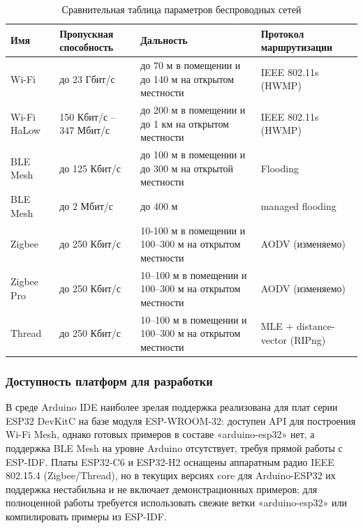 \documentclass[a4paper,12pt]{article}
\begin{document}
\begin{table}[h!]
    \centering
    \renewcommand{\arraystretch}{1.3}
    \begin{tabularx}{\textwidth}{|X|X|X|X|}
        \hline
        \textbf{Имя} & \textbf{Пропускная способность} & \textbf{Дальность} & \textbf{Протокол маршрутизации} \\
        \hline
        Wi-Fi & до 23 Гбит/с & до 70 м в помещении и до 140 м на открытом местности & IEEE 802.11s (HWMP) \\
        \hline
        Wi-Fi HaLow & 150 Кбит/с – 347 Мбит/с & до 200 м в помещении и до 1 км на открытом местности & IEEE 802.11s (HWMP) \\
        \hline
        BLE Mesh & до 125 Кбит/с & до 100 м в помещении и до 300 м на открытой местности & Flooding \\
        \hline
        BLE Mesh & до 2 Мбит/с & до 400 м & managed flooding \\
        \hline
        Zigbee & до 250 Кбит/с & 10-100 м в помещении и 100–300 м на открытом местности & AODV (изменяемо) \\
        \hline
        Zigbee Pro & до 250 Кбит/с & 10–100 м в помещении и 100–300 м на открытом местности & AODV (изменяемо) \\
        \hline
        Thread & до 250 Кбит/с & 10–100 м в помещении и 100–300 м на открытом местности & MLE + distance-vector (RIPng) \\
        \hline
    \end{tabularx}
    \caption{Сравнительная таблица параметров беспроводных сетей}
    \label{table:compare_wireless_protocols}
\end{table}

\subsubsection{Доступность платформ для разработки}

В среде Arduino IDE наиболее зрелая поддержка реализована для плат серии ESP32 DevKitC на базе модуля ESP-WROOM-32: доступен API для построения Wi-Fi Mesh,
однако готовых примеров в составе «arduino-esp32» нет, а поддержка BLE Mesh на уровне Arduino отсутствует, требуя прямой работы с ESP-IDF. Платы ESP32-C6 и
ESP32-H2 оснащены аппаратным радио IEEE 802.15.4 (Zigbee/Thread), но в текущих версиях core для Arduino-ESP32 их поддержка нестабильна и не включает
демонстрационных примеров; для полноценной работы требуется использовать свежие ветки «arduino-esp32» или компилировать примеры из ESP-IDF.
\end{document}
